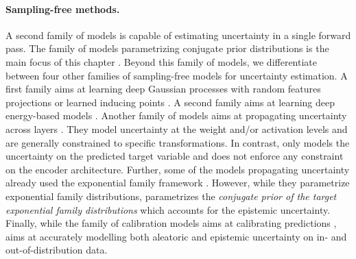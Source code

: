 \paragraph{Sampling-free methods.} A second family of models is capable of estimating uncertainty in a single forward pass. The family of models parametrizing conjugate prior distributions is the main focus of this chapter \citep{survey_evidential_uncertainty,robustness-uncertainty-dirichlet,max_gap_id_ood,uncertainty-generative-classifier,multifaceted_uncertainty,graph-postnet, lightweight-prob-net}. Beyond this family of models, we differentiate between four other families of sampling-free models for uncertainty estimation. A first family aims at learning deep Gaussian processes with random features projections or learned inducing points \citep{uncertainty-distance-awareness, due, duq, uceloss}. A second family aims at learning deep energy-based models \citep{ood_ebm, jem_ebm}. Another family of models aims at propagating uncertainty across layers \citep{natural-parameter-network, sampling-free-variance-propagation, feed-forward-propagation, lightweight-prob-net, probabilistic-backprop-scalable-bnn}. They model uncertainty at the weight and/or activation levels and are generally constrained to specific transformations. In contrast, \NatPNacro{} only models the uncertainty on the predicted target variable and does not enforce any constraint on the encoder architecture. Further, some of the models propagating uncertainty already used the exponential family framework \citep{natural-parameter-network, deep-exponential-families}. However, while they parametrize exponential family distributions, \NatPNacro{} parametrizes the \emph{conjugate prior of the target exponential family distributions} which accounts for the epistemic uncertainty. Finally, while the family of calibration models aims at calibrating predictions \citep{accurate-uncertainties-deep-learning-regression, confidence-aware-learning, individual-calibration, distribution-calibration-regression, intra-order-preserving}, \NatPNacro{} aims at accurately modelling both aleatoric and epistemic uncertainty on in- and out-of-distribution data.
